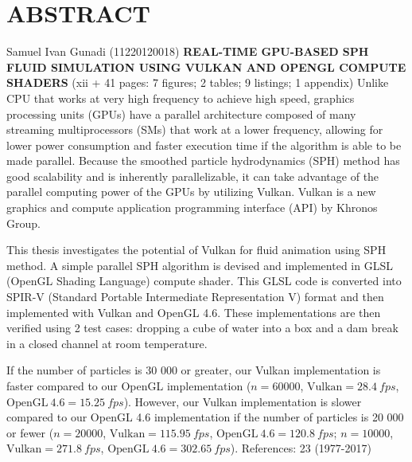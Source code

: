 \documentclass[a4paper, 12pt, oneside]{book}
\begin{document}
\chapter{ABSTRACT}

\begin{singlespace}
    Samuel Ivan Gunadi (11220120018)
    \newline
    {\bfseries\large\centering\MakeTextUppercase{Real-Time GPU-Based SPH Fluid Simulation Using Vulkan and OpenGL Compute Shaders}}
    \newline
    (xii + 41 pages: 7 figures; 2 tables; 9 listings; 1 appendix)
    \vspace{1\baselineskip}
    \newline
    Unlike CPU that works at very high frequency to achieve high speed, graphics processing units (GPUs) have a parallel architecture composed of many streaming multiprocessors (SMs) that work at a lower frequency, allowing for lower power consumption and faster execution time if the algorithm is able to be made parallel. Because the smoothed particle hydrodynamics (SPH) method has good scalability and is inherently parallelizable, it can take advantage of the parallel computing power of the GPUs by utilizing Vulkan. Vulkan is a new graphics and compute application programming interface (API) by Khronos Group.

    This thesis investigates the potential of Vulkan for fluid animation using SPH method. A simple parallel SPH algorithm is devised and implemented in GLSL (OpenGL Shading Language) compute shader. This GLSL code is converted into SPIR-V (Standard Portable Intermediate Representation V) format and then implemented with Vulkan and OpenGL 4.6. These implementations are then verified using 2 test cases: dropping a cube of water into a box and a dam break in a closed channel at room temperature.
    
    If the number of particles is 30 000 or greater, our Vulkan implementation is faster compared to our OpenGL implementation (\(n = 60 000\), \(\mathrm{Vulkan} = \SI{28.4}{fps}\), \(\mathrm{OpenGL\ 4.6} = \SI{15.25}{fps}\)). However, our Vulkan implementation is slower compared to our OpenGL 4.6 implementation if the number of particles is 20 000 or fewer (\(n = 20000\), \(\mathrm{Vulkan} = \SI{115.95}{fps}\), \(\mathrm{OpenGL\ 4.6} = \SI{120.8}{fps}\); \(n = 10000\), \(\mathrm{Vulkan} = \SI{271.8}{fps}\), \(\mathrm{OpenGL\ 4.6} = \SI{302.65}{fps}\)).
    \vspace{1\baselineskip}
    \newline
    References: 23 (1977-2017)
\end{singlespace}
\end{document}
